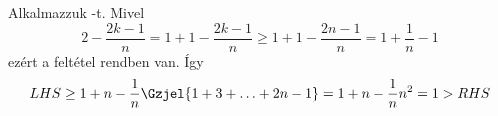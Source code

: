 Alkalmazzuk -t. Mivel 
$$
2 - \frac{2k-1}{n} = 1 + 1 - \frac{2k-1}{n} \ge 1 + 1 - \frac{2n-1}{n} = 
1 + \frac{1}{n}-1 
$$
ezért a feltétel rendben van. Így
$$
LHS \ge 1 + n - \frac{1}{n}\Gzjel{ 1 + 3 + \hdots + 2n-1 } = 
1 + n - \frac{1}{n}n^{2} = 1 > RHS
$$
